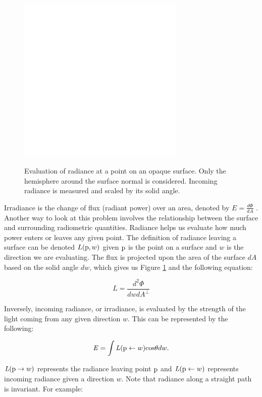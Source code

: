 \documentclass[12pt]{ucthesis}
\newcommand{\captionfonts}{\small\bf\ssp}
\begin{document}
\begin{figure}[h!]
    \centering
    \includegraphics[width=80mm]{img/diag/radiance.pdf}
    \captionfonts
    \caption{Evaluation of radiance at a point on an opaque surface.  Only the hemisphere around the surface normal is considered.  Incoming radiance is measured and scaled by its solid angle.}
    \label{fig:radiance}
\end{figure}

Irradiance is the change of flux (radiant power) over an area, denoted by $E = \frac{d\Phi}{dA}$ \cite{aga}. Another way to look at this problem involves the relationship between the surface and surrounding radiometric quantities.  Radiance helps us evaluate how much power enters or leaves any given point.  The definition of radiance leaving a surface can be denoted $L(\textup{p}, w)$ given $\textup{p}$ is the point on a surface and $w$ is the direction we are evaluating.  The flux is projected upon the area of the surface $dA$ based on the solid angle $dw$, which gives us Figure \ref{fig:radiance} and the following equation:

\begin{equation}
\mathit{L} = \frac{\mathit{d^{2}\Phi}}{\mathit{dwdA}^\perp}
\label{eq:radiance}
\end{equation}

Inversely, incoming radiance, or irradiance, is evaluated by the strength of the light coming from any given direction $w$.  This  can be represented by the following:

\begin{equation}
\mathit{E} = \int\mathit{L}(\textup{p} \leftarrow w)\textup{cos}\theta dw.
\label{eq:irradiance}
\end{equation}

$\mathit{L}(\textup{p} \to w)$ represents the radiance leaving point $\textup{p}$ and $\mathit{L}(\textup{p} \leftarrow w)$ represents incoming radiance given a direction $w$.  Note that radiance along a straight path is invariant.  For example:
\end{document}
